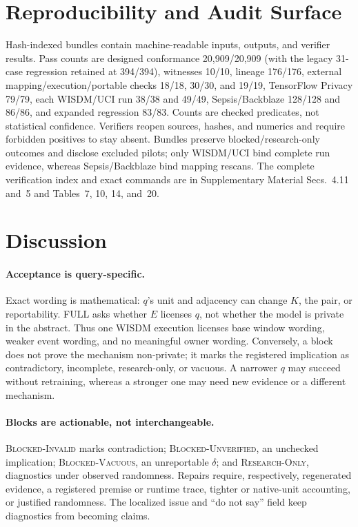 \documentclass[letterpaper]{article} %
\newcommand{\AuditContractTestCount}{83}
\begin{document}
\section{Reproducibility and Audit Surface}

Hash-indexed bundles contain machine-readable inputs, outputs, and verifier results. Pass counts are designed conformance 20,909/20,909 (with the legacy 31-case regression retained at 394/394), witnesses 10/10, lineage 176/176, external mapping/execution/portable checks 18/18, 30/30, and 19/19, TensorFlow Privacy 79/79, each WISDM/UCI run 38/38 and 49/49, Sepsis/Backblaze 128/128 and 86/86, and expanded regression \AuditContractTestCount/\AuditContractTestCount. Counts are checked predicates, not statistical confidence. Verifiers reopen sources, hashes, and numerics and require forbidden positives to stay absent. Bundles preserve blocked/research-only outcomes and disclose excluded pilots; only WISDM/UCI bind complete run evidence, whereas Sepsis/Backblaze bind mapping rescans. The complete verification index and exact commands are in Supplementary Material Secs.~4.11 and~5 and Tables~7, 10, 14, and~20.

\section{Discussion}

\paragraph{Acceptance is query-specific.}
Exact wording is mathematical: $q$'s unit and adjacency can change $K$, the pair, or reportability. FULL asks whether $E$ licenses $q$, not whether the model is private in the abstract. Thus one WISDM execution licenses base window wording, weaker event wording, and no meaningful owner wording. Conversely, a block does not prove the mechanism non-private; it marks the registered implication as contradictory, incomplete, research-only, or vacuous. A narrower $q$ may succeed without retraining, whereas a stronger one may need new evidence or a different mechanism.

\paragraph{Blocks are actionable, not interchangeable.}
\textsc{Blocked-Invalid} marks contradiction; \textsc{Blocked-Unverified}, an unchecked implication; \textsc{Blocked-Vacuous}, an unreportable $\delta$; and \textsc{Research-Only}, diagnostics under observed randomness. Repairs require, respectively, regenerated evidence, a registered premise or runtime trace, tighter or native-unit accounting, or justified randomness. The localized issue and ``do not say'' field keep diagnostics from becoming claims.
\end{document}

